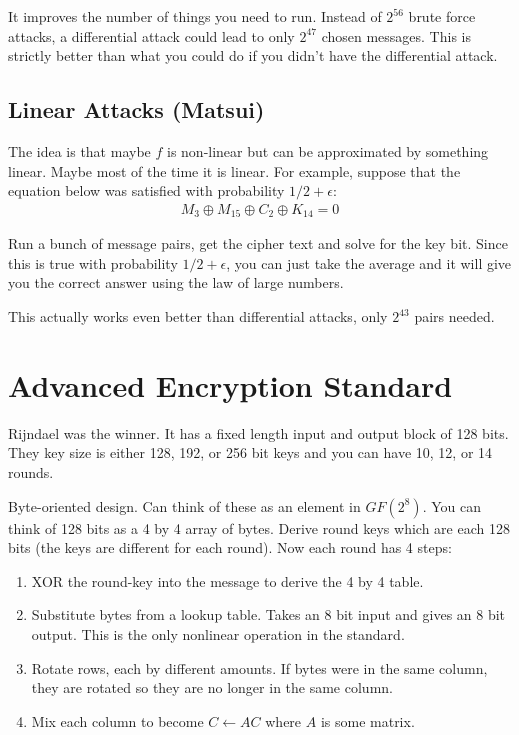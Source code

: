 \documentclass[psamsfonts]{amsart}
\begin{document}
It improves the number of things you need to run. Instead of $2^{56}$ brute force attacks, a differential attack could lead to only $2^{47}$ chosen messages. This is strictly better than what you could do if you didn't have the differential attack.

\subsection{Linear Attacks (Matsui)}

The idea is that maybe $f$ is non-linear but can be approximated by something linear. Maybe most of the time it is linear. For example, suppose that the equation below was satisfied with probability $1/2 + \epsilon$:
\begin{eqnarray}
  M_3 \oplus M_{15} \oplus C_{2} \oplus K_{14} = 0
\end{eqnarray}

Run a bunch of message pairs, get the cipher text and solve for the key bit. Since this is true with probability $1/2 + \epsilon$, you can just take the average and it will give you the correct answer using the law of large numbers.

This actually works even better than differential attacks, only $2^{43}$ pairs needed.

\section{Advanced Encryption Standard}

Rijndael was the winner. It has a fixed length input and output block of 128 bits. They key size is either 128, 192, or 256 bit keys and you can have 10, 12, or 14 rounds.

Byte-oriented design. Can think of these as an element in $GF(2^8)$. You can think of 128 bits as a 4 by 4 array of bytes. Derive round keys which are each 128 bits (the keys are different for each round). Now each round has 4 steps:
\begin{enumerate}
  \item XOR the round-key into the message to derive the 4 by 4 table.
  \item Substitute bytes from a lookup table. Takes an 8 bit input and gives an 8 bit output. This is the only nonlinear operation in the standard.
  \item Rotate rows, each by different amounts. If bytes were in the same column, they are rotated so they are no longer in the same column.
  \item Mix each column to become $C \leftarrow A C$ where $A$ is some matrix.
\end{enumerate}
\end{document}
